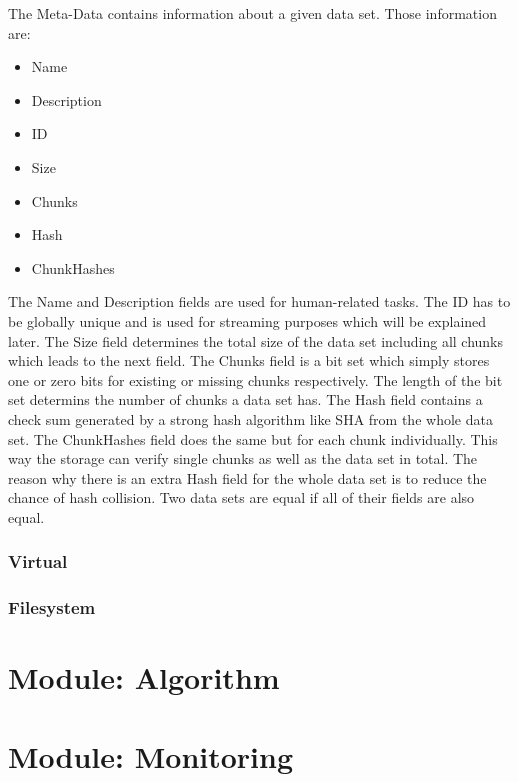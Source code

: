 The Meta-Data contains information about a given data set. Those information are:
\begin{itemize} 
\item Name
\item Description
\item ID
\item Size
\item Chunks
\item Hash
\item ChunkHashes
\end{itemize}
The Name and Description fields are used for human-related tasks. The ID has to be globally unique and is used for streaming purposes which will be explained later. The Size field determines the total size of the data set including all chunks which leads to the next field. The Chunks field is a bit set which simply stores one or zero bits for existing or missing chunks respectively. The length of the bit set determins the number of chunks a data set has. The Hash field contains a check sum generated by a strong hash algorithm like SHA from the whole data set. The ChunkHashes field does the same but for each chunk individually. This way the storage can verify single chunks as well as the data set in total. The reason why there is an extra Hash field for the whole data set is to reduce the chance of hash collision. Two data sets are equal if all of their fields are also equal.

\subsubsection{Virtual}
\subsubsection{Filesystem}


\section{Module: Algorithm}
\label{sec:algorithm}

\section{Module: Monitoring}
\label{sec:monitoring}


